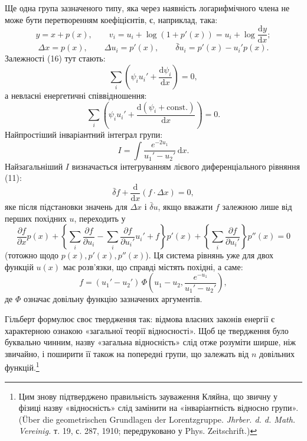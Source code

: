 \documentclass[11pt]{article}
\providecommand{\D}{\Delta}
\providecommand{\p}{\partial}
\providecommand{\dd}{\mathrm d}
\providecommand{\bd}{\bar{\delta}}
\providecommand{\lg}{\log}
\begin{document}
Ще одна група зазначеного типу, яка через наявність логарифмічного члена не може бути перетворенням коефіцієнтів, є, наприклад, така:
\[
y=x+p(x),\qquad
v_i=u_i+\lg(1+p'(x))=u_i+\lg\frac{\dd y}{\dd x};
\]
\[
\D x=p(x),\qquad
\D u_i=p'(x),\qquad
\bd u_i=p'(x)-u_i'p(x).
\]
Залежності (16) тут стають:
\[
\sum_i\left(\psi_i u_i'+\frac{\dd\psi_i}{\dd x}\right)=0,
\]
а невласні енергетичні співвідношення:
\[
\sum_i\left(\psi_i u_i'+
\frac{\dd(\psi_i+\mathrm{const.})}{\dd x}\right)=0.
\]
Найпростіший інваріантний інтеграл групи:
\[
I=\int \frac{e^{-2u_1}}{u_1'-u_2'}\,\dd x.
\]
Найзагальніший \(I\) визначається інтегруванням лієвого диференціального рівняння (11):
\[
\bd f+\frac{\dd}{\dd x}(f\cdot \D x)=0,
\]
яке після підстановки значень для \(\D x\) і \(\bd u\), якщо вважати \(f\) залежною лише від перших похідних \(u\), переходить у
\[
\frac{\p f}{\p x}p(x)
+\left\{\sum_i\frac{\p f}{\p u_i}
-\sum_i\frac{\p f}{\p u_i'}u_i'+f\right\}p'(x)
+\left\{\sum_i\frac{\p f}{\p u_i'}\right\}p''(x)=0
\]
(тотожно щодо \(p(x),p'(x),p''(x)\)). Ця система рівнянь уже для двох функцій \(u(x)\) має розв'язки, що справді містять похідні, а саме:
\[
f=(u_1'-u_2')\,
\Phi\!\left(u_1-u_2,\frac{e^{-u_1}}{u_1'-u_2'}\right),
\]
де \(\Phi\) означає довільну функцію зазначених аргументів.

Гільберт формулює своє твердження так: відмова власних законів енергії є характерною ознакою «загальної теорії відносності». Щоб це твердження було буквально чинним, назву «загальна відносність» слід отже розуміти ширше, ніж звичайно, і поширити її також на попередні групи, що залежать від \(n\) довільних функцій.\footnote{Цим знову підтверджено правильність зауваження Кляйна, що звичну у фізиці назву «відносність» слід замінити на «інваріантність відносно групи». (Über die geometrischen Grundlagen der Lorentzgruppe. \emph{Jhrber. d. d. Math. Vereinig.} т. 19, с. 287, 1910; передруковано у Phys. Zeitschrift.)}
\end{document}

